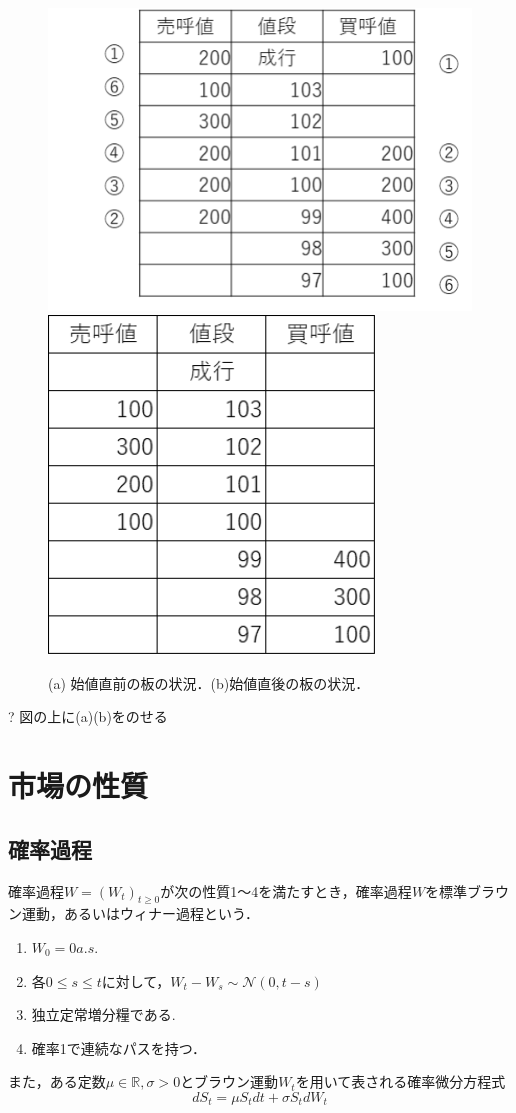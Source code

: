 \documentclass[titlepage]{jsreport}
\begin{document}
\begin{figure}[htbp]
    \centering
    \includegraphics[width=0.49\linewidth]{fig/itayose.pdf}
    \hfil
    \includegraphics[width=0.335\linewidth]{fig/continuous.pdf}
    \caption{(a) 始値直前の板の状況．(b)始値直後の板の状況．}
    \label{fig:opening}
\end{figure}
? 図の上に(a)(b)をのせる

\section{市場の性質}
\subsection{確率過程}
確率過程$W = (W_t)_{t \geq 0}$が次の性質1～4を満たすとき，確率過程$W$を標準ブラウン運動，あるいはウィナー過程という\cite{stochastic_integration}．
\begin{enumerate}
    \item $W_0 = 0  a.s.$
    \item 各$0 \leq s \leq t$に対して，$W_t - W_s \sim \mathcal{N}(0, t - s)$
    \item 独立定常増分糧である.
    \item 確率1で連続なパスを持つ．
\end{enumerate}

また，ある定数$\mu \in \mathbb{R}, \sigma > 0$とブラウン運動$W_t$を用いて表される確率微分方程式
\begin{equation}
    dS_t = \mu S_t dt + \sigma S_t dW_t \label{eq:geoBrow_equation}
\end{equation}
\end{document}
